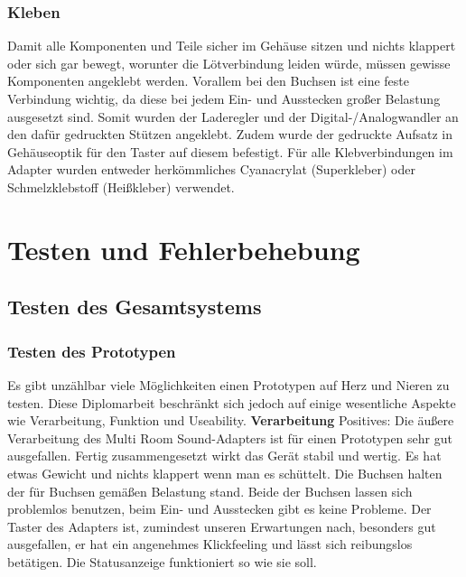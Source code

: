 \documentclass[11pt, twoside]{article}
\begin{document}
\subsubsection{Kleben}
Damit alle Komponenten und Teile sicher im Gehäuse sitzen und nichts klappert oder sich gar bewegt, worunter die Lötverbindung leiden würde, müssen gewisse Komponenten angeklebt werden. Vorallem bei den Buchsen ist eine feste Verbindung wichtig, da diese bei jedem Ein- und Ausstecken großer Belastung ausgesetzt sind. Somit wurden der Laderegler und der Digital-/Analogwandler an den dafür gedruckten Stützen angeklebt. Zudem wurde der gedruckte Aufsatz in Gehäuseoptik für den Taster auf diesem befestigt. Für alle Klebverbindungen im Adapter wurden entweder herkömmliches Cyanacrylat (Superkleber) oder Schmelzklebstoff (Heißkleber) verwendet.

\section{Testen und Fehlerbehebung}
\subsection{Testen des Gesamtsystems}
\subsubsection{Testen des Prototypen}
Es gibt unzählbar viele Möglichkeiten einen Prototypen auf Herz und Nieren zu testen. Diese Diplomarbeit beschränkt sich jedoch auf einige wesentliche Aspekte wie Verarbeitung, Funktion und Useability.
\vspace{4mm}\newline
\textbf{Verarbeitung}
\vspace{4mm}\newline
Positives:\newline
Die äußere Verarbeitung des Multi Room Sound-Adapters ist für einen Prototypen sehr gut ausgefallen. Fertig zusammengesetzt wirkt das Gerät stabil und wertig. Es hat etwas Gewicht und nichts klappert wenn man es schüttelt. Die Buchsen halten der für Buchsen gemäßen Belastung stand. Beide der Buchsen lassen sich problemlos benutzen, beim Ein- und Ausstecken gibt es keine Probleme. Der Taster des Adapters ist, zumindest unseren Erwartungen nach, besonders gut ausgefallen, er hat ein angenehmes Klickfeeling und lässt sich reibungslos betätigen. Die Statusanzeige funktioniert so wie sie soll.
\end{document}
